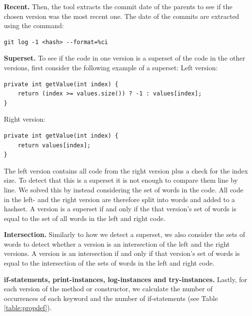 \textbf{Recent.} Then, the tool extracts the commit date of the parents to see if the chosen version was the most recent one. The date of the commits are extracted using the command:
\lstset{language=Bash,numbers=left,xleftmargin=2em,frame=single,framexleftmargin=1.5em}
\begin{lstlisting}[frame=single,breaklines=true,tabsize=2]
git log -1 <hash> --format=%ci
\end{lstlisting}

\textbf{Superset.} To see if the code in one version is a superset of the code in the other versions, first consider the following example of a superset:
Left version:
\lstset{language=Java,numbers=left,xleftmargin=2em,frame=single,framexleftmargin=1.5em}
\begin{lstlisting}[frame=single,breaklines=true,tabsize=2]
private int getValue(int index) {
	return (index >= values.size()) ? -1 : values[index];
}
\end{lstlisting}

Right version:
\lstset{language=Java,numbers=left,xleftmargin=2em,frame=single,framexleftmargin=1.5em}
\begin{lstlisting}[frame=single,breaklines=true,tabsize=2]
private int getValue(int index) {
	return values[index];
}
\end{lstlisting}
The left version contains all code from the right version plus a check for the index size. To detect that this is a superset it is not enough to compare them line by line. We solved this by instead considering the set of words in the code. All code in the left- and the right version are therefore split into words and added to a hashset. A version is a superset if and only if the  that version’s set of words is equal to the set of all words in the left and right code.

\textbf{Intersection.} Similarly to how we detect a superset, we also consider the sets of words to detect whether a version is an intersection of the left and the right versions. A version is an intersection if and only if that version’s set of words is equal to the intersection of the sets of words in the left and right code.

\textbf{if-statements, print-instances, log-instances and try-instances.} Lastly, for each version of the method or constructor, we calculate the number of occurrences of each keyword and the number of if-statements (see Table \ref{table:propdef}).